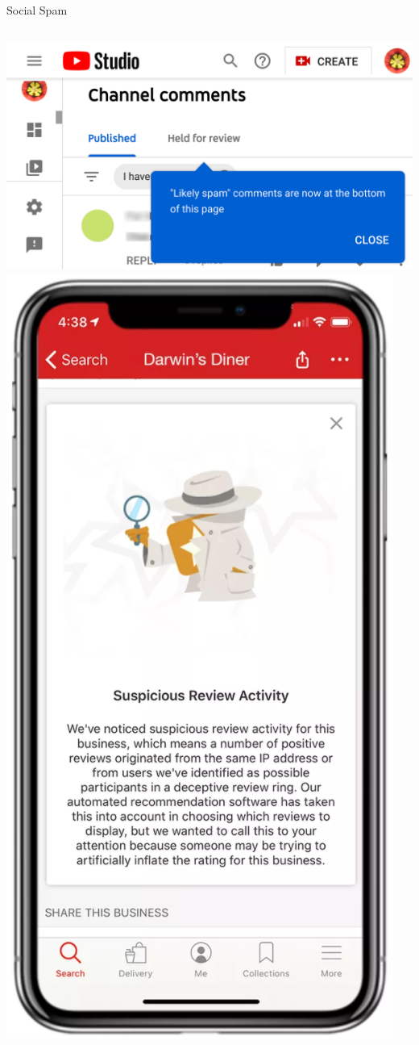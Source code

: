 \documentclass[nobackground,dvipsnames,table]{beamer}
\begin{document}
\begin{frame}{Social Spam}
    \begin{columns}
            \includegraphics[width=\textwidth]{yt-social-spam}
            \includegraphics[width=\textwidth]{yelp-spam}

\end{columns}
\end{frame}
\end{document}
